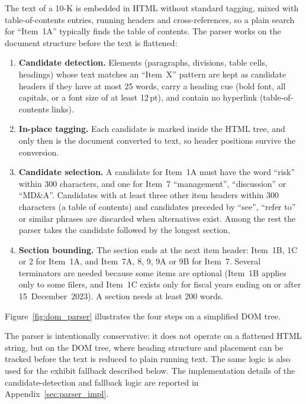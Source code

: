 The text of a 10-K is embedded in HTML without standard tagging, mixed with
table-of-contents entries, running headers and cross-references, so a plain
search for ``Item~1A'' typically finds the table of contents. The parser
works on the document structure before the text is flattened:
\begin{enumerate}
  \item \textbf{Candidate detection.} Elements (paragraphs, divisions, table
    cells, headings) whose text matches an ``Item~X'' pattern are kept as
    candidate headers if they have at most 25 words, carry a heading cue
    (bold font, all capitals, or a font size of at least 12\,pt), and contain
    no hyperlink (table-of-contents links).
  \item \textbf{In-place tagging.} Each candidate is marked inside the HTML
    tree, and only then is the document converted to text, so header
    positions survive the conversion.
  \item \textbf{Candidate selection.} A candidate for Item~1A must have the
    word ``risk'' within 300 characters, and one for Item~7 ``management'',
    ``discussion'' or ``MD\&A''. Candidates with at least three other item
    headers within 300 characters (a table of contents) and candidates
    preceded by ``see'', ``refer to'' or similar phrases are discarded when
    alternatives exist. Among the rest the parser takes the candidate
    followed by the longest section.
  \item \textbf{Section bounding.} The section ends at the next item header:
    Item~1B, 1C or 2 for Item~1A, and Item~7A, 8, 9, 9A or 9B for Item~7.
    Several terminators are needed because some items are optional (Item~1B
    applies only to some filers, and Item~1C exists only for fiscal years
    ending on or after 15~December~2023). A section needs at least 200 words.
\end{enumerate}

Figure~\ref{fig:dom_parser} illustrates the four steps on a simplified DOM
tree.



The parser is intentionally conservative: it does not operate on a flattened
HTML string, but on the DOM tree, where heading structure and placement can be
tracked before the text is reduced to plain running text. The same logic is
also used for the exhibit fallback described below. The implementation
details of the candidate-detection and fallback logic are reported in
Appendix~\ref{sec:parser_impl}.

